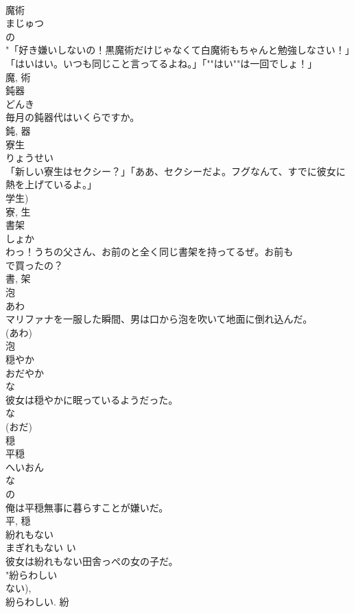 \documentclass[8pt]{extreport}
\begin{document}
\begin{CJK}{UTF8}{min}
\\	魔術	
\\	まじゅつ	
\\	の 
\\	"「好き嫌いしないの！黒魔術だけじゃなくて白魔術もちゃんと勉強しなさい！」「はいはい。いつも同じこと言ってるよね。」「""はい""は一回でしょ！」
\\	魔, 術	
\\	鈍器	
\\	どんき	
\\	毎月の鈍器代はいくらですか。	
\\	鈍, 器	
\\	寮生	
\\	りょうせい	
\\	「新しい寮生はセクシー？」「ああ、セクシーだよ。フグなんて、すでに彼女に熱を上げているよ。」	
\\	学生) 
\\	寮, 生	
\\	書架	
\\	しょか	
\\	わっ！うちの父さん、お前のと全く同じ書架を持ってるぜ。お前も
\\	で買ったの？	
\\	書, 架	
\\	泡	
\\	あわ	
\\	マリファナを一服した瞬間、男は口から泡を吹いて地面に倒れ込んだ。	
\\	(あわ) 
\\	泡	
\\	穏やか	
\\	おだやか	
\\	な 
\\	彼女は穏やかに眠っているようだった。	
\\	な 
\\	(おだ) 
\\	穏	
\\	平穏	
\\	へいおん	
\\	な 
\\	の 
\\	俺は平穏無事に暮らすことが嫌いだ。	
\\	平, 穏	
\\	紛れもない	
\\	まぎれもない	い 
\\	彼女は紛れもない田舎っぺの女の子だ。	
\\	"紛らわしい 
\\	ない), 
\\	紛らわしい.	紛	

\end{CJK}
\end{document}
